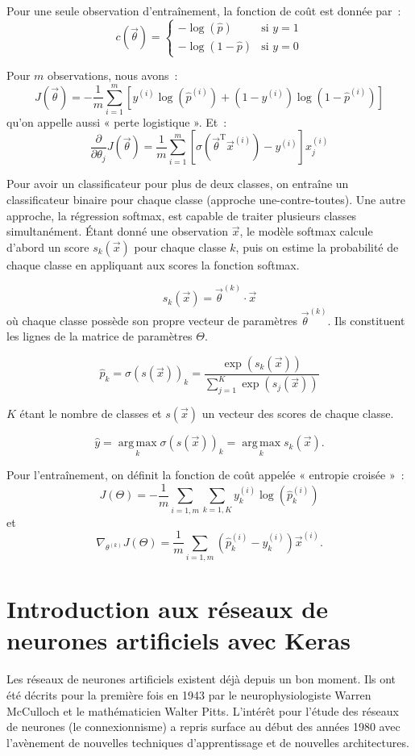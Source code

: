\documentclass[a4paper,12pt,twoside]{report}
\theoremstyle{definition}
\theoremstyle{plain}
\theoremstyle{remark}
\begin{document}
Pour une seule observation d'entraînement, la fonction de coût est donnée par~:
\[ c(\vec{\theta}) = \begin{cases} -\log(\hat{p}) & \text{si } y = 1 \\ -\log(1-\hat{p}) & \text{si } y = 0 \end{cases} \]

Pour $m$ observations, nous avons~:
\[ J(\vec{\theta}) = -\frac{1}{m} \sum_{i=1}^{m} \left[ y^{(i)} \log(\hat{p}^{(i)}) + (1-y^{(i)}) \log(1-\hat{p}^{(i)}) \right] \]
qu'on appelle aussi « perte logistique ». Et~:
\[ \frac{\partial}{\partial \theta_j} J(\vec{\theta}) = \frac{1}{m} \sum_{i=1}^{m} \left[ \sigma(\vec{\theta}^{\mathrm{T}} \vec{x}^{(i)}) - y^{(i)} \right] x_j^{(i)} \]

Pour avoir un classificateur pour plus de deux classes, on entraîne un classificateur binaire pour chaque classe (approche une-contre-toutes). Une autre approche, la régression softmax, est capable de traiter plusieurs classes simultanément. Étant donné une observation $\vec{x}$, le modèle softmax calcule d'abord un score $s_k(\vec{x})$ pour chaque classe $k$, puis on estime la probabilité de chaque classe en appliquant aux scores la fonction softmax.

\[ s_k(\vec{x}) = \vec{\theta}^{(k)} \cdot \vec{x} \]
où chaque classe possède son propre vecteur de paramètres $\vec{\theta}^{(k)}$. Ils constituent les lignes de la matrice de paramètres $\Theta$.

\[ \hat{p}_k = \sigma(s(\vec{x}))_k = \frac{\exp(s_k(\vec{x}))}{\sum_{j=1}^{K} \exp(s_j(\vec{x}))} \]

$K$ étant le nombre de classes et $s(\vec{x})$ un vecteur des scores de chaque classe.

\[ \hat{y} = \operatorname*{arg\,max}_k \sigma(s(\vec{x}))_k = \operatorname*{arg\,max}_k s_k(\vec{x}). \]

Pour l'entraînement, on définit la fonction de coût appelée « entropie croisée »~:
\[ J(\Theta) = -\frac{1}{m} \sum_{i=1,m} \sum_{k=1,K} y_k^{(i)} \log(\hat{p}_k^{(i)}) \]
et
\[ \nabla_{\theta^{(k)}} J(\Theta) = \frac{1}{m} \sum_{i=1,m} \left( \hat{p}_k^{(i)} - y_k^{(i)} \right) \vec{x}^{(i)}. \]

\section[Réseaux de neurones avec Keras]{Introduction aux réseaux de neurones artificiels avec Keras}

Les réseaux de neurones artificiels existent déjà depuis un bon moment. Ils ont été décrits pour la première fois en 1943 par le neurophysiologiste Warren McCulloch et le mathématicien Walter Pitts. L'intérêt pour l'étude des réseaux de neurones (le connexionnisme) a repris surface au début des années 1980 avec l'avènement de nouvelles techniques d'apprentissage et de nouvelles architectures.
\end{document}
